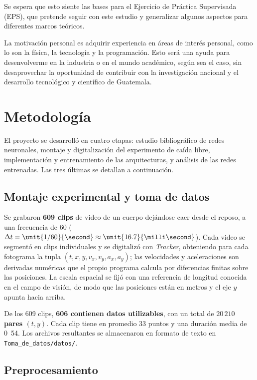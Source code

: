 \documentclass[titlepage,11pt]{article}
\providecommand{\num}[1]{\ensuremath{#1}}
\begin{document}
Se espera que esto siente las bases para el Ejercicio de Práctica Supervisada
(EPS), que pretende seguir con este estudio y generalizar algunos aspectos para
diferentes marcos teóricos.

La motivación personal es adquirir experiencia en áreas de interés personal,
como lo son la física, la tecnología y la programación. Esto será una ayuda
para desenvolverme en la industria o en el mundo académico, según sea el caso,
sin desaprovechar la oportunidad de contribuir con la investigación nacional y
el desarrollo tecnológico y científico de Guatemala.


\section{Metodología}
\label{sec:metodologia}

El proyecto se desarrolló en cuatro etapas: estudio bibliográfico de redes
neuronales, montaje y digitalización del experimento de caída libre,
implementación y entrenamiento de las arquitecturas, y análisis de las redes
entrenadas. Las tres últimas se detallan a continuación.

\subsection{Montaje experimental y toma de datos}
\label{sec:datos}

Se grabaron \textbf{609 clips} de video de un cuerpo dejándose caer desde el
reposo, a una frecuencia de \unit{60}{\hertz} ($\Delta t = \unit{1/60}{\second}
\approx \unit{16.7}{\milli\second}$). Cada video se segmentó en clips
individuales y se digitalizó con \emph{Tracker}, obteniendo para cada
fotograma la tupla $(t,x,y,v_x,v_y,a_x,a_y)$; las velocidades y aceleraciones
son derivadas numéricas que el propio programa calcula por diferencias finitas
sobre las posiciones. La escala espacial se fijó con una referencia de longitud
conocida en el campo de visión, de modo que las posiciones están en metros y el
eje $y$ apunta hacia arriba.

De los 609 clips, \textbf{606 contienen datos utilizables}, con un total de
\textbf{\num{20\,210} pares $(t,y)$}. Cada clip tiene en promedio 33 puntos y una
duración media de \unit{0.54}{\second}. Los archivos resultantes se almacenaron
en formato de texto en \texttt{Toma\_de\_datos/datos/}.

\subsection{Preprocesamiento}
\end{document}

